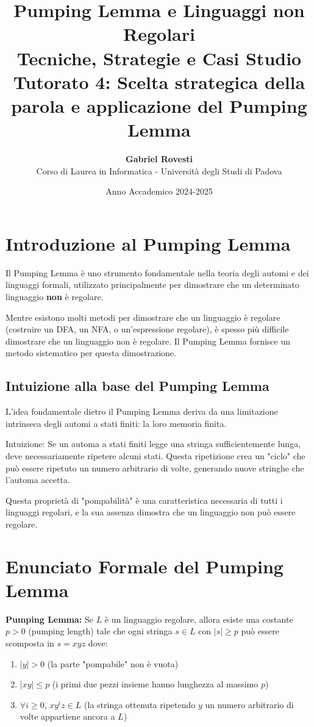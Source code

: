 \documentclass[12pt,a4paper]{article}
\title{
  \vspace{1cm}
  \Huge \textbf{Pumping Lemma e Linguaggi non Regolari}\\[0.5cm]
  \Large \textbf{Tecniche, Strategie e Casi Studio}\\
  \normalsize Tutorato 4: Scelta strategica della parola e applicazione del Pumping Lemma
}
\author{\textbf{Gabriel Rovesti} \\
Corso di Laurea in Informatica - Università degli Studi di Padova
}
\date{Anno Accademico 2024-2025}
\begin{document}
\maketitle
\tableofcontents
\newpage

\section{Introduzione al Pumping Lemma}

Il Pumping Lemma è uno strumento fondamentale nella teoria degli automi e dei linguaggi formali, utilizzato principalmente per dimostrare che un determinato linguaggio \textbf{non} è regolare.

\begin{concettochiave}
Mentre esistono molti metodi per dimostrare che un linguaggio è regolare (costruire un DFA, un NFA, o un'espressione regolare), è spesso più difficile dimostrare che un linguaggio non è regolare. Il Pumping Lemma fornisce un metodo sistematico per questa dimostrazione.
\end{concettochiave}

\subsection{Intuizione alla base del Pumping Lemma}

L'idea fondamentale dietro il Pumping Lemma deriva da una limitazione intrinseca degli automi a stati finiti: la loro memoria finita.

\begin{suggerimento}
Intuizione: Se un automa a stati finiti legge una stringa sufficientemente lunga, deve necessariamente ripetere alcuni stati. Questa ripetizione crea un "ciclo" che può essere ripetuto un numero arbitrario di volte, generando nuove stringhe che l'automa accetta.
\end{suggerimento}

Questa proprietà di "pompabilità" è una caratteristica necessaria di tutti i linguaggi regolari, e la sua assenza dimostra che un linguaggio non può essere regolare.

\section{Enunciato Formale del Pumping Lemma}

\begin{concettochiave}
\textbf{Pumping Lemma:} Se $L$ è un linguaggio regolare, allora esiste una costante $p > 0$ (pumping length) tale che ogni stringa $s \in L$ con $|s| \geq p$ può essere scomposta in $s = xyz$ dove:
\begin{enumerate}
    \item $|y| > 0$ (la parte "pompabile" non è vuota)
    \item $|xy| \leq p$ (i primi due pezzi insieme hanno lunghezza al massimo $p$)
    \item $\forall i \geq 0$, $xy^iz \in L$ (la stringa ottenuta ripetendo $y$ un numero arbitrario di volte appartiene ancora a $L$)
\end{enumerate}
\end{concettochiave}
\end{document}
